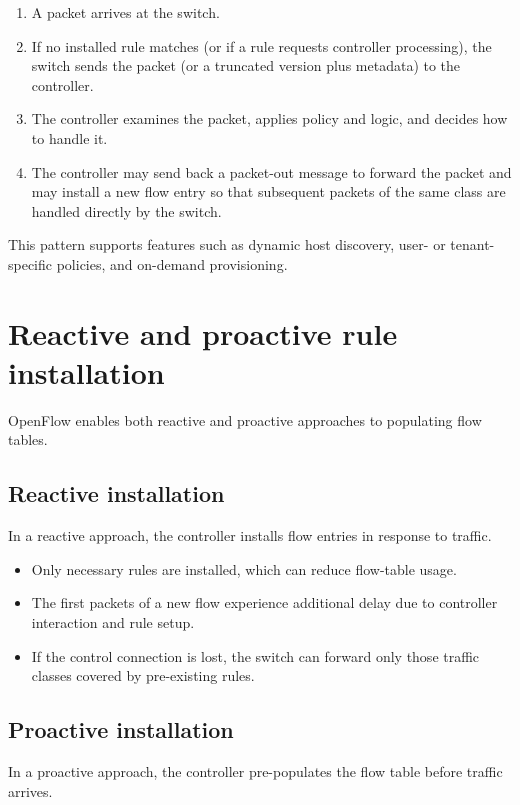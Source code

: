 \documentclass[11pt,a4paper,openany]{report}
\begin{document}
\begin{enumerate}
\item A packet arrives at the switch.
\item If no installed rule matches (or if a rule requests controller processing), the switch sends the packet (or a truncated version plus metadata) to the controller.
\item The controller examines the packet, applies policy and logic, and decides how to handle it.
\item The controller may send back a packet-out message to forward the packet and may install a new flow entry so that subsequent packets of the same class are handled directly by the switch.
\end{enumerate}

This pattern supports features such as dynamic host discovery, user- or tenant-specific policies, and on-demand provisioning.

\section{Reactive and proactive rule installation}

OpenFlow enables both reactive and proactive approaches to populating flow tables.

\subsection{Reactive installation}

In a reactive approach, the controller installs flow entries in response to traffic.

\begin{itemize}
\item Only necessary rules are installed, which can reduce flow-table usage.
\item The first packets of a new flow experience additional delay due to controller interaction and rule setup.
\item If the control connection is lost, the switch can forward only those traffic classes covered by pre-existing rules.
\end{itemize}

\subsection{Proactive installation}

In a proactive approach, the controller pre-populates the flow table before traffic arrives.
\end{document}
